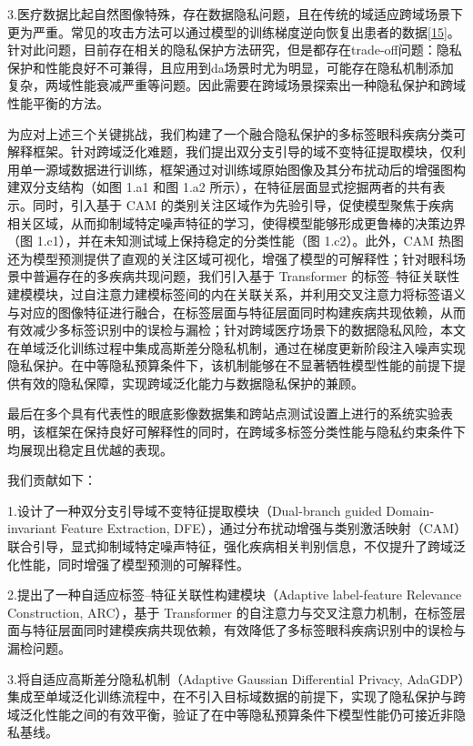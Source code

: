 3.医疗数据比起自然图像特殊，存在数据隐私问题，且在传统的域适应跨域场景下更为严重。常见的攻击方法可以通过模型的训练梯度逆向恢复出患者的数据\hyperref[_Ref213949393]{{[}15{]}}。针对此问题，目前存在相关的隐私保护方法研究，但是都存在trade-off问题：隐私保护和性能良好不可兼得，且应用到da场景时尤为明显，可能存在隐私机制添加复杂，两域性能衰减严重等问题。因此需要在跨域场景探索出一种隐私保护和跨域性能平衡的方法。

为应对上述三个关键挑战，我们构建了一个融合隐私保护的多标签眼科疾病分类可解释框架。针对跨域泛化难题，我们提出双分支引导的域不变特征提取模块，仅利用单一源域数据进行训练，框架通过对训练域原始图像及其分布扰动后的增强图构建双分支结构（如图 1.a1 和图 1.a2 所示），在特征层面显式挖掘两者的共有表示。同时，引入基于 CAM 的类别关注区域作为先验引导，促使模型聚焦于疾病相关区域，从而抑制域特定噪声特征的学习，使得模型能够形成更鲁棒的决策边界（图 1.c1），并在未知测试域上保持稳定的分类性能（图 1.c2）。此外，CAM 热图还为模型预测提供了直观的关注区域可视化，增强了模型的可解释性；针对眼科场景中普遍存在的多疾病共现问题，我们引入基于 Transformer 的标签--特征关联性建模模块，过自注意力建模标签间的内在关联关系，并利用交叉注意力将标签语义与对应的图像特征进行融合，在标签层面与特征层面同时构建疾病共现依赖，从而有效减少多标签识别中的误检与漏检；针对跨域医疗场景下的数据隐私风险，本文在单域泛化训练过程中集成高斯差分隐私机制，通过在梯度更新阶段注入噪声实现隐私保护。在中等隐私预算条件下，该机制能够在不显著牺牲模型性能的前提下提供有效的隐私保障，实现跨域泛化能力与数据隐私保护的兼顾。

最后在多个具有代表性的眼底影像数据集和跨站点测试设置上进行的系统实验表明，该框架在保持良好可解释性的同时，在跨域多标签分类性能与隐私约束条件下均展现出稳定且优越的表现。

我们贡献如下：

1.设计了一种双分支引导域不变特征提取模块（Dual-branch guided Domain-invariant Feature Extraction, DFE），通过分布扰动增强与类别激活映射（CAM）联合引导，显式抑制域特定噪声特征，强化疾病相关判别信息，不仅提升了跨域泛化性能，同时增强了模型预测的可解释性。

2.提出了一种自适应标签--特征关联性构建模块（Adaptive label-feature Relevance Construction, ARC），基于 Transformer 的自注意力与交叉注意力机制，在标签层面与特征层面同时建模疾病共现依赖，有效降低了多标签眼科疾病识别中的误检与漏检问题。

3.将自适应高斯差分隐私机制（Adaptive Gaussian Differential Privacy, AdaGDP）集成至单域泛化训练流程中，在不引入目标域数据的前提下，实现了隐私保护与跨域泛化性能之间的有效平衡，验证了在中等隐私预算条件下模型性能仍可接近非隐私基线。

